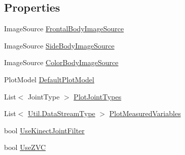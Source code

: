 \subsection*{Properties}
\begin{DoxyCompactItemize}
\item 
Image\+Source \hyperlink{class_rowing_monitor_1_1_model_1_1_pipeline_1_1_rowing_monitor_pipeline_a1af351a022ab0e290f8a6e3b14beca3b}{Frontal\+Body\+Image\+Source}
\item 
Image\+Source \hyperlink{class_rowing_monitor_1_1_model_1_1_pipeline_1_1_rowing_monitor_pipeline_abf8b7a9fa1090bf85976374ec303151d}{Side\+Body\+Image\+Source}
\item 
Image\+Source \hyperlink{class_rowing_monitor_1_1_model_1_1_pipeline_1_1_rowing_monitor_pipeline_affd26b0d4b0fd4fc310e3ed60e517db2}{Color\+Body\+Image\+Source}
\item 
Plot\+Model \hyperlink{class_rowing_monitor_1_1_model_1_1_pipeline_1_1_rowing_monitor_pipeline_a91cb4d291d11eae9d5a89812d63ad393}{Default\+Plot\+Model}
\item 
List$<$ Joint\+Type $>$ \hyperlink{class_rowing_monitor_1_1_model_1_1_pipeline_1_1_rowing_monitor_pipeline_a3cb3e07377fa4699c6d6fd2ffac25d3f}{Plot\+Joint\+Types}
\item 
List$<$ \hyperlink{namespace_rowing_monitor_1_1_model_1_1_util_a01e1a06061533b246feb7421c9d0107f}{Util.\+Data\+Stream\+Type} $>$ \hyperlink{class_rowing_monitor_1_1_model_1_1_pipeline_1_1_rowing_monitor_pipeline_afb69846db7e227f02f16426b33e40334}{Plot\+Measured\+Variables}
\item 
bool \hyperlink{class_rowing_monitor_1_1_model_1_1_pipeline_1_1_rowing_monitor_pipeline_a91b4012aec501a90d0435c4ac117832d}{Use\+Kinect\+Joint\+Filter}
\item 
bool \hyperlink{class_rowing_monitor_1_1_model_1_1_pipeline_1_1_rowing_monitor_pipeline_adb430c312bae7b16bd6ae08e9f7450af}{Use\+Z\+VC}

\end{DoxyCompactItemize}
